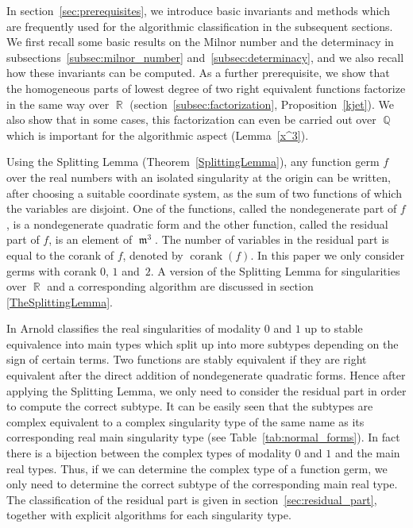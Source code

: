 \documentclass[noend]{amsproc}
\theoremstyle{definition}
\DeclareMathOperator{\m}{\mathfrak{m}}
\DeclareMathOperator{\corank}{corank}
\DeclareMathOperator{\Q}{\mathbb{Q}}
\DeclareMathOperator{\R}{\mathbb{R}}
\begin{document}
In section~\ref{sec:prerequisites}, we introduce basic invariants and methods
which are frequently used for the algorithmic classification in the subsequent
sections. We first recall some basic results on the Milnor number and the
determinacy in subsections~\ref{subsec:milnor_number}
and~\ref{subsec:determinacy}, and we also recall how these invariants
can be computed. As a further prerequisite, we show that the homogeneous parts
of lowest degree of two right equivalent functions factorize in the same way
over $\R$ (section~\ref{subsec:factorization}, Proposition~\ref{kjet}). We also
show that in some cases, this factorization can even be carried out over $\Q$
which is important for the algorithmic aspect (Lemma~\ref{x^3}).

Using the Splitting Lemma (Theorem~\ref{SplittingLemma}), any function germ $f$
over the real numbers with an isolated singularity at the origin can be
written, after choosing a suitable coordinate system, as the sum of two
functions of which the variables are disjoint. One of the functions, called the
nondegenerate part of $f$, is a nondegenerate quadratic form and the other
function, called the residual part of $f$, is an element of $\m^3$. The number
of variables in the residual part is equal to the corank of $f$, denoted by
$\corank(f)$. In this paper we only consider germs with corank $0$, $1$
and~$2$. A version of the Splitting Lemma for singularities over $\R$ and a
corresponding algorithm are discussed in section \ref{TheSplittingLemma}.

In \cite{AVG1985} Arnold classifies the real singularities of modality $0$ and
$1$ up to stable equivalence into main types which split up into more subtypes
depending on the sign of certain terms. Two functions are stably equivalent if
they are right equivalent after the direct addition of nondegenerate quadratic
forms. Hence after applying the Splitting Lemma, we only need to consider the
residual part in order to compute the correct subtype. It can be easily seen
that the subtypes are complex equivalent to a complex singularity type of the
same name as its corresponding real main singularity type (see
Table~\ref{tab:normal_forms}). In fact there is a bijection between the complex
types of modality $0$ and $1$ and the main real types. Thus, if we can
determine the complex type of a function germ, we only need to determine the
correct subtype of the corresponding main real type. The classification of the
residual part is given in section~\ref{sec:residual_part}, together with
explicit algorithms for each singularity type.
\end{document}
